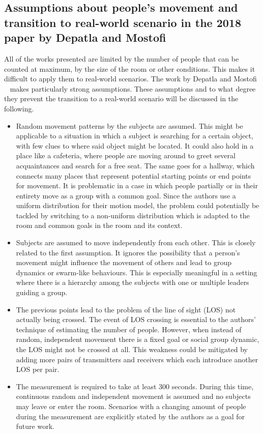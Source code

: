 \documentclass[conference]{IEEEtran}
\begin{document}
\subsection{Assumptions about people's movement and transition to real-world scenario in the 2018 paper by Depatla and Mostofi}
All of the works presented are limited by the number of people that can be counted at maximum, by the size of the room or other conditions. This makes it difficult to apply them to real-world scenarios. The work by Depatla and Mostofi ~\cite{DepatlaMostofi2018} makes particularly strong assumptions. These assumptions and to what degree they prevent the transition to a real-world scenario will be discussed in the following.
\begin{itemize}
\item Random movement patterns by the subjects are assumed. This might be applicable to a situation in which a subject is searching for a certain object, with few clues to where said object might be located. It could also hold in a place like a cafeteria, where people are moving around to greet several acquaintances and search for a free seat. The same goes for a hallway, which connects many places that represent potential starting points or end points for movement. It is problematic in a case in which people partially or in their entirety move as a group with a common goal. Since the authors use a uniform distribution for their motion model, the problem could potentially be tackled by switching to a non-uniform distribution which is adapted to the room and common goals in the room and its context.
\item Subjects are assumed to move independently from each other. This is closely related to the first assumption. It ignores the possibility that a person's movement might influence the movement of others and lead to group dynamics or swarm-like behaviours. This is especially meaningful in a setting where there is a hierarchy among the subjects with one or multiple leaders guiding a group.
\item The previous points lead to the problem of the line of sight (LOS) not actually being crossed. The event of LOS crossing is essential to the authors' technique of estimating the number of people. However, when instead of random, independent movement there is a fixed goal or social group dynamic, the LOS might not be crossed at all. This weakness could be mitigated by adding more pairs of transmitters and receivers which each introduce another LOS per pair.
\item The measurement is required to take at least 300 seconds. During this time, continuous random and independent movement is assumed and no subjects may leave or enter the room. Scenarios with a changing amount of people during the measurement are explicitly stated by the authors as a goal for future work.

\end{itemize}
\end{document}

